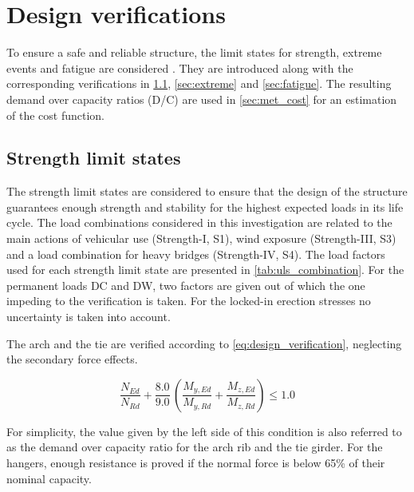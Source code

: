 \section{Design verifications} \label{sec:met_ver}
To ensure a safe and reliable structure, the limit states for strength, extreme events and fatigue are considered \cite{AASHTO}. They are introduced along with the corresponding verifications in \cref{sec:strength}, \cref{sec:extreme} and \cref{sec:fatigue}. The resulting demand over capacity ratios (D/C) are used in \cref{sec:met_cost} for an estimation of the cost function.

\subsection{Strength limit states}\label{sec:strength}
The strength limit states are considered to ensure that the design of the structure guarantees enough strength and stability for the highest expected loads in its life cycle. The load combinations considered in this investigation are related to the main actions of vehicular use (Strength-I, S1), wind exposure (Strength-III, S3) and a load combination for heavy bridges (Strength-IV, S4). The load factors used for each strength limit state are presented in \cref{tab:uls_combination}. For the permanent loads DC and DW, two factors are given out of which the one impeding to the verification is taken. For the locked-in erection stresses no uncertainty is taken into account.



The arch and the tie are verified according to \cref{eq:design_verification}, neglecting the secondary force effects. 

\begin{equation}
    \frac{N_{Ed}}{N_{Rd}} + \frac{8.0}{9.0}\, \left(\frac{M_{y,Ed}}{M_{y,Rd}}+\frac{M_{z,Ed}}{M_{z,Rd}} \right) \leq 1.0
    \label{eq:design_verification}
\end{equation}

For simplicity, the value given by the left side of this condition is also referred to as the demand over capacity ratio for the arch rib and the tie girder. For the hangers, enough resistance is proved if the normal force is below 65\% of their nominal capacity. 

